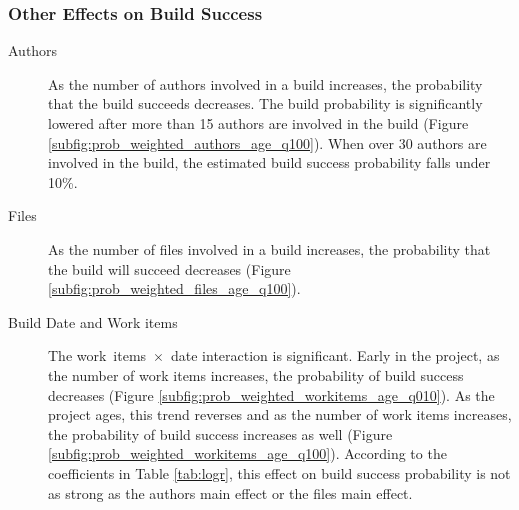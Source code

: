 \subsubsection{Other Effects on Build Success}
\label{sec:effectauthors}
\begin{description}
\item[Authors] As the number of authors involved in a build increases, the probability that the build succeeds decreases. The build probability is significantly lowered after more than 15 authors are involved in the build (Figure \ref{subfig:prob_weighted_authors_age_q100}). When over 30 authors are involved in the build, the estimated build success probability falls under 10\%.

\item[Files] As the number of files involved in a build increases, the probability that the build will succeed decreases (Figure \ref{subfig:prob_weighted_files_age_q100}).

\item[Build Date and Work items] The work~items~$\times$~date interaction is significant. Early in the project, as the number of work items increases, the probability of build success decreases (Figure \ref{subfig:prob_weighted_workitems_age_q010}). As the project ages, this trend reverses and as the number of work items increases, the probability of build success increases as well (Figure \ref{subfig:prob_weighted_workitems_age_q100}). According to the coefficients in Table \ref{tab:logr}, this effect on build success probability is not as strong as the authors main effect or the files main effect.
\end{description}


